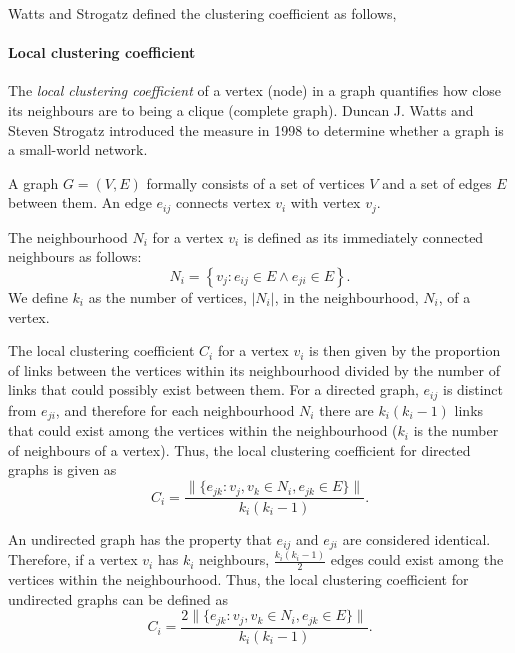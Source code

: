         Watts and Strogatz defined the clustering coefficient as follows, 
              
      \paragraph{Local clustering coefficient}
              
        The \emph{local clustering coefficient} of a vertex (node) in a graph quantifies how close its neighbours are to being a clique (complete graph). Duncan J. Watts and Steven Strogatz introduced the measure in 1998 to determine whether a graph is a small-world network.
              
        A graph $G=(V,E)$ formally consists of a set of vertices $V$ and a set of edges $E$ between them. An edge $e_{ij}$ connects vertex $v_i$ with vertex $v_j$.

        The neighbourhood $N_i$ for a vertex $v_i$ is defined as its immediately connected neighbours as follows:
        \begin{equation}
          N_i = \left\{v_j: e_{ij} \in E \wedge e_{ji} \in E\right\} \mbox{.}
        \end{equation}
        We define $k_i$ as the number of vertices, $|N_i|$, in the neighbourhood, $N_i$, of a vertex.

        The local clustering coefficient $C_i$ for a vertex $v_i$ is then given by the proportion of links between the vertices within its neighbourhood divided by the number of links that could possibly exist between them. For a directed graph, $e_{ij}$ is distinct from $e_{ji}$, and therefore for each neighbourhood $N_i$ there are $k_i(k_i-1)$ links that could exist among the vertices within the neighbourhood ($k_i$ is the number of neighbours of a vertex). Thus, the local clustering coefficient for directed graphs is given as \cite{WattsStrogatz1998}
        \begin{equation}
          C_i = \frac{\|\{e_{jk}: v_j,v_k \in N_i, e_{jk} \in E\}\|}{k_i(k_i-1)} \mbox{.}
        \end{equation}
    
        An undirected graph has the property that $e_{ij}$ and $e_{ji}$ are considered identical. Therefore, if a vertex $v_i$ has $k_i$ neighbours, $\frac{k_i(k_i-1)}{2}$ edges could exist among the vertices within the neighbourhood. Thus, the local clustering coefficient for undirected graphs can be defined as
        \begin{equation}
          C_i = \frac{2\|\{e_{jk}: v_j,v_k \in N_i, e_{jk} \in E\}\|}{k_i(k_i-1)} \mbox{.}
        \end{equation}

